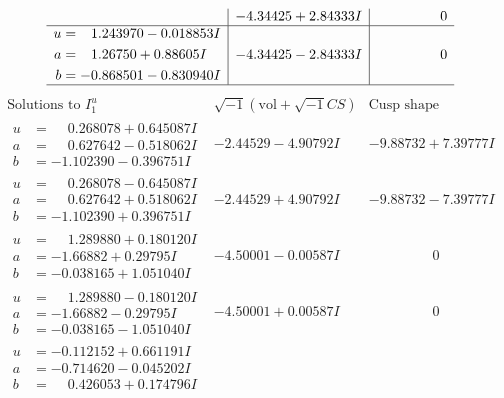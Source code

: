 \documentclass[1p]{elsarticle_modified}
\theoremstyle{definition}
\newcommand{\I}{\sqrt{-1}}
\begin{document}
$$\begin{array}{c|c|c}
 & -4.34425 + 2.84333 I & \phantom{-0.000000 } 0 \\ \hline\begin{aligned}
u &= \phantom{-}1.243970 - 0.018853 I \\
a &= \phantom{-}1.26750 + 0.88605 I \\
b &= -0.868501 - 0.830940 I\end{aligned}
 & -4.34425 - 2.84333 I & \phantom{-0.000000 } 0\\
 \hline 
 \end{array}$$\newpage$$\begin{array}{c|c|c}  
\text{Solutions to }I^u_{1}& \I (\text{vol} + \sqrt{-1}CS) & \text{Cusp shape}\\
 \hline 
\begin{aligned}
u &= \phantom{-}0.268078 + 0.645087 I \\
a &= \phantom{-}0.627642 - 0.518062 I \\
b &= -1.102390 - 0.396751 I\end{aligned}
 & -2.44529 - 4.90792 I & -9.88732 + 7.39777 I \\ \hline\begin{aligned}
u &= \phantom{-}0.268078 - 0.645087 I \\
a &= \phantom{-}0.627642 + 0.518062 I \\
b &= -1.102390 + 0.396751 I\end{aligned}
 & -2.44529 + 4.90792 I & -9.88732 - 7.39777 I \\ \hline\begin{aligned}
u &= \phantom{-}1.289880 + 0.180120 I \\
a &= -1.66882 + 0.29795 I \\
b &= -0.038165 + 1.051040 I\end{aligned}
 & -4.50001 - 0.00587 I & \phantom{-0.000000 } 0 \\ \hline\begin{aligned}
u &= \phantom{-}1.289880 - 0.180120 I \\
a &= -1.66882 - 0.29795 I \\
b &= -0.038165 - 1.051040 I\end{aligned}
 & -4.50001 + 0.00587 I & \phantom{-0.000000 } 0 \\ \hline\begin{aligned}
u &= -0.112152 + 0.661191 I \\
a &= -0.714620 - 0.045202 I \\
b &= \phantom{-}0.426053 + 0.174796 I\end{aligned}

\end{array}$$
\end{document}
